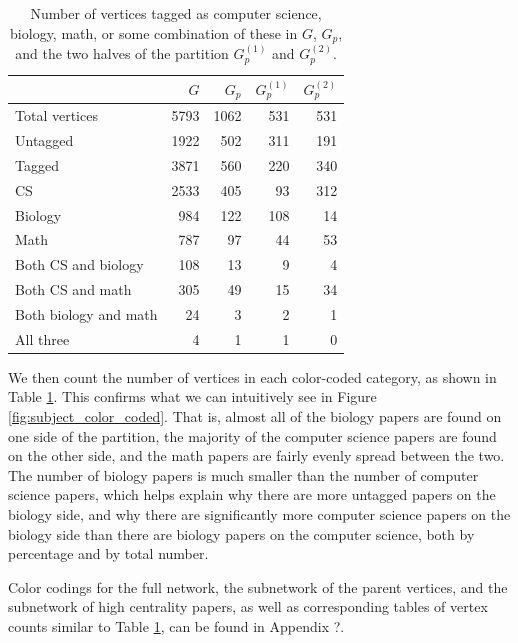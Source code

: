 \documentclass[12pt]{thesis}
\theoremstyle{plain}
\theoremstyle{definition}
\theoremstyle{remark}
\begin{document}
\begin{table}[t]
\centering
\begin{tabular}{|l|r|r|r|r|}
\hline & $G$ & $G_p$ & $G_p^{(1)}$ & $G_p^{(2)}$ \\ \hline
Total vertices & 5793 & 1062 & 531 & 531 \\ \hline
Untagged & 1922 & 502 & 311 & 191 \\ \hline
Tagged & 3871 & 560 & 220 & 340 \\ \hline
CS & 2533 & 405 & 93 & 312 \\ \hline
Biology & 984 & 122 & 108 & 14 \\ \hline
Math & 787 & 97 & 44 & 53 \\ \hline
Both CS and biology & 108 & 13 & 9 & 4 \\ \hline
Both CS and math & 305 & 49 & 15 & 34 \\ \hline
Both biology and math & 24 & 3 & 2 & 1 \\ \hline
All three & 4 & 1 & 1 & 0 \\ \hline
\end{tabular}
\caption{Number of vertices tagged as computer science, biology, math, or some combination of these in $G$, $G_p$, and the two halves of the partition $G_p^{(1)}$ and $G_p^{(2)}$.}
\label{tab:subject_counts}
\end{table}

We then count the number of vertices in each color-coded category, as shown in Table \ref{tab:subject_counts}. This confirms what we can intuitively see in Figure \ref{fig:subject_color_coded}. That is, almost all of the biology papers are found on one side of the partition, the majority of the computer science papers are found on the other side, and the math papers are fairly evenly spread between the two. The number of biology papers is much smaller than the number of computer science papers, which helps explain why there are more untagged papers on the biology side, and why there are significantly more computer science papers on the biology side than there are biology papers on the computer science, both by percentage and by total number.

Color codings for the full network, the subnetwork of the parent vertices, and the subnetwork of high centrality papers, as well as corresponding tables of vertex counts similar to Table \ref{tab:subject_counts}, can be found in Appendix ?.
\end{document}
